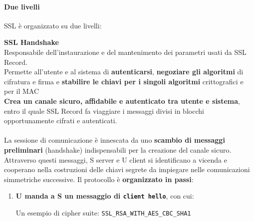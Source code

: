\documentclass[10pt]{book}
\begin{document}
\paragraph{Due livelli} SSL è organizzato su due livelli:\begin{list}{}{}	
	\item \textbf{SSL Handshake}\\
	Responsabile dell'instaurazione e del mantenimento dei parametri usati da SSL Record.\\
	Permette all'utente e al sistema di \textbf{autenticarsi}, \textbf{negoziare gli algoritmi} di cifratura e firma e \textbf{stabilire le chiavi per i singoli algoritmi} crittografici e per il MAC\\
	\textbf{Crea un canale sicuro, affidabile e autenticato tra utente e sistema}, entro il quale SSL Record fa viaggiare i messaggi divisi in blocchi opportunamente cifrati e autenticati.\\\\
	La sessione di comunicazione è innescata da uno \textbf{scambio di messaggi preliminari} (handshake) indispensabili per la creazione del canale sicuro. Attraverso questi messaggi, S server e U client si identificano a vicenda e cooperano nella costruzioni delle chiavi segrete da impiegare nelle comunicazioni simmetriche successive. Il protocollo è \textbf{organizzato in passi}:
	\begin{enumerate}
		\item \textbf{U manda a S un messaggio di \texttt{client hello}}, con cui:
		Un esempio di cipher suite: \texttt{SSL\_RSA\_WITH\_AES\_CBC\_SHA1}

\end{enumerate}
\end{list}
\end{document}

